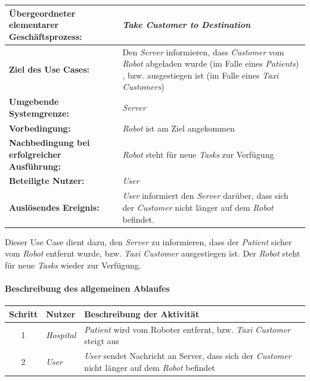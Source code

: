 				\begin{table}[H]
					\centering
					\begin{tabularx}{\textwidth}{|p{5cm}|X|}
						\hline
						\textbf{Übergeordneter elementarer Geschäftsprozess:} & \emph{Take Customer to Destination} \\ \hline
						\textbf{Ziel des Use Cases:} & Den \emph{Server} informieren, dass \emph{Customer} vom \emph{Robot} abgeladen wurde (im Falle eines \emph{Patients}) , bzw. ausgestiegen ist (im Falle eines \emph{Taxi Customers}) \\ \hline
						\textbf{Umgebende Systemgrenze:} & \emph{Server} \\ \hline
						\textbf{Vorbedingung:} & \emph{Robot} ist am Ziel angekommen \\ \hline
						\textbf{Nachbedingung bei erfolgreicher Ausführung:} & \emph{Robot} steht für neue \emph{Tasks} zur Verfügung \\ \hline
						\textbf{Beteiligte Nutzer:} & \emph{User} \\ \hline
						\textbf{Auslösendes Ereignis:} & \emph{User} informiert den \emph{Server} darüber, dass sich der \emph{Customer} nicht länger auf dem \emph{Robot} befindet. \\
						\hline
					\end{tabularx}
				\end{table}
				
				Dieser Use Case dient dazu, den \emph{Server} zu informieren, dass der \emph{Patient} sicher vom \emph{Robot} entfernt wurde, bzw. \emph{Taxi Customer} ausgestiegen ist. Der \emph{Robot} steht für neue \emph{Tasks} wieder zur Verfügung.
				
				\paragraph*{Beschreibung des allgemeinen Ablaufes}
					\begin{table}[H]
					\centering
					\begin{tabularx}{\textwidth}{|c|p{2cm}|X|}
					\hline
					Schritt & Nutzer & Beschreibung der Aktivität \\ \hline
					1 & \emph{Hospital} & \emph{Patient} wird vom Roboter entfernt, bzw. \emph{Taxi Customer} steigt aus \\
					2 & \emph{User} & \emph{User} sendet Nachricht an {Server}, dass sich der \emph{Customer} nicht länger auf dem \emph{Robot} befindet \\
					\hline
					\end{tabularx}
				\end{table}
		
